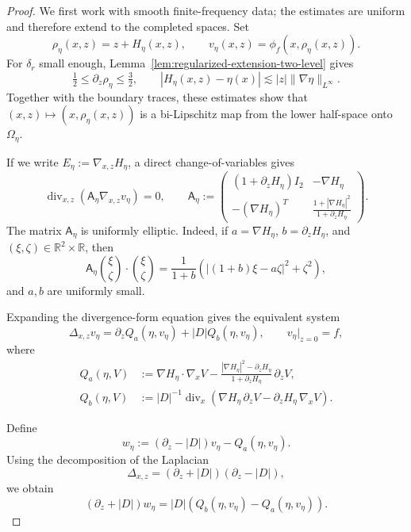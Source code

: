 \documentclass[12pt]{amsart}
\theoremstyle{remark}
\theoremstyle{definition}
\numberwithin{equation}{section}
\newcommand{\R}{\mathbb{R}}
\begin{document}
\begin{proof}
We first work with smooth finite-frequency data; the estimates are uniform
and therefore extend to the completed spaces. Set
\[
 \rho_\eta(x,z)=z+H_\eta(x,z),
 \qquad v_\eta(x,z)=\phi_f(x,\rho_\eta(x,z)).
\]
For \(\delta_r\) small enough, Lemma~\ref{lem:regularized-extension-two-level} gives
\[
\tfrac12\leq\partial_z\rho_\eta\leq\tfrac32, \qquad |H_\eta(x,z)-\eta(x)|
 \lesssim |z|\|\nabla\eta\|_{L^\infty}.
\]
Together with the boundary traces, these estimates show that \((x,z)\mapsto(x,\rho_\eta(x,z))\) is a bi-Lipschitz map from the lower
half-space onto \(\Omega_\eta\).

If we write \(E_\eta:=\nabla_{x,z}H_\eta\), a direct change-of-variables gives
\begin{equation*}
 \operatorname{div}_{x,z} \left( \mathsf A_\eta\nabla_{x,z}v_\eta \right)=0, \qquad
 \mathsf A_\eta  :=
 \begin{pmatrix}
 (1+\partial_zH_\eta)I_2 & -\nabla H_\eta\\[2mm]
 -(\nabla H_\eta)^T & \displaystyle \frac{1+|\nabla H_\eta|^2} {1+\partial_zH_\eta}
 \end{pmatrix}.
\end{equation*}
The matrix \(\mathsf A_\eta\) is uniformly elliptic.
Indeed, if \(a=\nabla H_\eta\), \(b=\partial_zH_\eta\), and \((\xi,\zeta)\in\R^2\times\R\), then
\[
 \mathsf A_\eta \binom{\xi}{\zeta} \cdot \binom{\xi}{\zeta} = \frac1{1+b} \left( |(1+b)\xi-a\zeta|^2+\zeta^2 \right),
\]
and \(a,b\) are uniformly small.

Expanding the divergence-form equation gives the equivalent system
\begin{equation*}
 \Delta_{x,z}v_\eta = \partial_zQ_a(\eta,v_\eta) + |D|Q_b(\eta,v_\eta), \qquad v_\eta|_{z=0}=f,
\end{equation*}
where
\begin{align*}
 Q_a(\eta,V) &:= \nabla H_\eta\cdot\nabla_xV
 -\frac{|\nabla H_\eta|^2-\partial_zH_\eta}
 {1+\partial_zH_\eta}\,\partial_zV,\\
 Q_b(\eta,V) &:= |D|^{-1}\operatorname{div}_x
 \left(  \nabla H_\eta\,\partial_zV
  -\partial_zH_\eta\,\nabla_xV \right).
\end{align*}

Define
\[
 w_\eta := (\partial_z-|D|)v_\eta - Q_a(\eta,v_\eta).
\]
Using the decomposition of the Laplacian
\[
 \Delta_{x,z} = (\partial_z+|D|)(\partial_z-|D|),
\]
we obtain
\begin{equation*}
 (\partial_z+|D|)w_\eta = |D| \left( Q_b(\eta,v_\eta)-Q_a(\eta,v_\eta) \right).
\end{equation*}


\end{proof}
\end{document}
